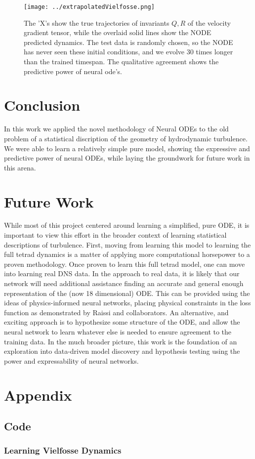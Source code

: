 \documentclass{amsart}
\begin{document}
\begin{figure}%
  \centering
  \texttt{[image: ../extrapolatedVielfosse.png]}
  \caption{The 'X's show the true trajectories of invariants $Q,R$ of the velocity gradient tensor, while the overlaid solid lines show the NODE predicted dynamics. The test data is randomly chosen, so the NODE has never seen these initial conditions, and we evolve 30 times longer than the trained timespan. The qualitative agreement shows the predictive power of neural ode's.}
  \label{fig:extrapolatedVielfosse}
\end{figure}


\section{Conclusion}
In this work we applied the novel methodology of Neural ODEs to the old problem of a statistical discription of the geometry of hydrodynamic turbulence. We were able to learn a relatively simple pure model, showing the expressive and predictive power of neural ODEs, while laying the groundwork for future work in this arena.

\section{Future Work}
While most of this project centered around learning a simplified, pure ODE, it is important to view this effort in the broader context of learning statistical descriptions of turbulence. First, moving from learning this model to learning the full tetrad dynamics is a matter of applying more computational horsepower to a proven methodology. Once proven to learn this full tetrad model, one can move into learning real DNS data. \newline
\indent In the approach to real data, it is likely that our network will need additional assistance finding an accurate and general enough representation of the (now 18 dimensional) ODE. This can be provided using the ideas of physics-informed neural networks, placing physical constraints in the loss function as demonstrated by Raissi and collaborators\cite{raissiPINNs2019}. An alternative, and exciting approach is to hypothesize some structure of the ODE, and allow the neural network to learn whatever else is needed to ensure agreement to the training data.\newline
\indent In the much broader picture, this work is the foundation of an exploration into data-driven model discovery and hypothesis testing using the power and expressability of neural networks.

\newpage
\section{Appendix}

\subsection{Code}\label{subsec:Code}
\subsubsection{Learning Vielfosse Dynamics}\label{lst:vielfosseLearning}
\hfill{}



\newpage


\end{document}
